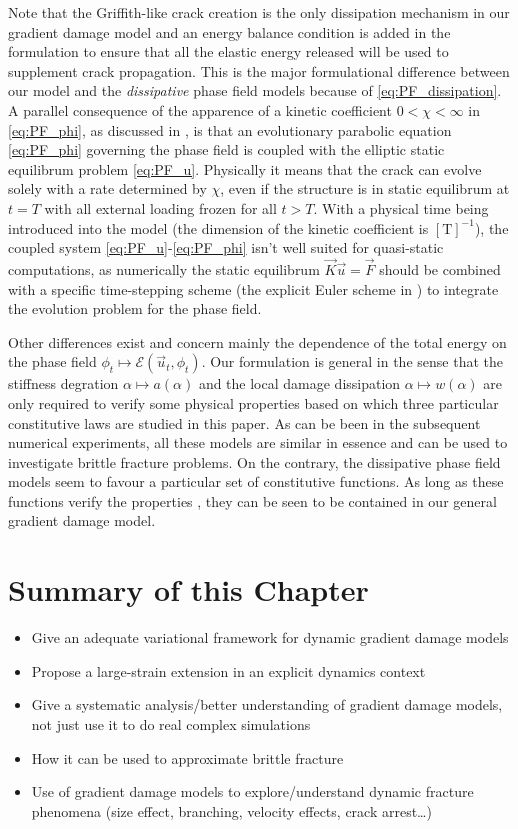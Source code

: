 Note that the Griffith-like crack creation is the only dissipation mechanism in our gradient damage model and an energy balance condition  is added in the formulation to ensure that all the elastic energy released will be used to supplement crack propagation. This is the major formulational difference between our model and the \emph{dissipative} phase field models because of \eqref{eq:PF_dissipation}. A parallel consequence of the apparence of a kinetic coefficient $0<\chi<\infty$ in \eqref{eq:PF_phi}, as discussed in \cite{Bourdin:2011}, is that an evolutionary parabolic equation \eqref{eq:PF_phi} governing the phase field is coupled with the elliptic static equilibrum problem \eqref{eq:PF_u}. Physically it means that the crack can evolve solely with a rate determined by $\chi$, even if the structure is in static equilibrum at $t=T$ with all external loading frozen for all $t>T$. With a physical time being introduced into the model (the dimension of the kinetic coefficient is $[\mathrm{T}]^{-1}$), the coupled system \eqref{eq:PF_u}-\eqref{eq:PF_phi} isn't well suited for quasi-static computations, as numerically the static equilibrum  $\vec{K}\vec{u}=\vec{F}$ should be combined with a specific time-stepping scheme (the explicit Euler scheme in \cite{HakimKarma:2009}) to integrate the evolution problem for the phase field.

Other differences exist and concern mainly the dependence of the total energy on the phase field $\phi_t\mapsto\mathcal{E}(\vec{u}_t,\phi_t)$. Our formulation is general in the sense that the stiffness degration $\alpha\mapsto a(\alpha)$ and the local damage dissipation $\alpha\mapsto w(\alpha)$ are only required to verify some physical properties  based on which three particular constitutive laws are studied in this paper. As can be been in the subsequent numerical experiments, all these models are similar in essence and can be used to investigate brittle fracture problems. On the contrary, the dissipative phase field models \cite{KarmaKesslerLevine:2001,HakimKarma:2009} seem to favour a particular set of constitutive functions. As long as these functions verify the properties , they can be seen to be contained in our general gradient damage model. 


\section{Summary of this Chapter} \label{sec:summarychap1}
\begin{itemize}
\item Give an adequate variational framework for dynamic gradient damage models
\item Propose a large-strain extension in an explicit dynamics  context
\item Give a systematic analysis/better understanding of gradient damage models, not just use it to do real complex simulations
\item How it can be used to approximate brittle fracture
\item Use of gradient damage models to explore/understand dynamic fracture phenomena (size effect, branching, velocity effects, crack arrest\ldots)
\end{itemize}